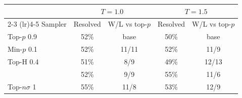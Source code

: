 \begin{tabular}{lcccc}
\toprule
 & \multicolumn{2}{c}{$T{=}1.0$} & \multicolumn{2}{c}{$T{=}1.5$} \\
\cmidrule(lr){2-3} \cmidrule(lr){4-5}
Sampler & Resolved & W/L vs top-$p$ & Resolved & W/L vs top-$p$ \\
\midrule
Top-$p$ 0.9 & 52\% & base & 50\% & base \\
Min-$p$ 0.1 & 52\% & 11/11 & 52\% & 11/9 \\
Top-H 0.4 & 51\% & 8/9 & 49\% & 12/13 \\
\pless{} & 52\% & 9/9 & 55\% & 11/6 \\
Top-$n\sigma$ 1 & 55\% & 11/8 & 53\% & 12/9 \\
\bottomrule
\end{tabular}
